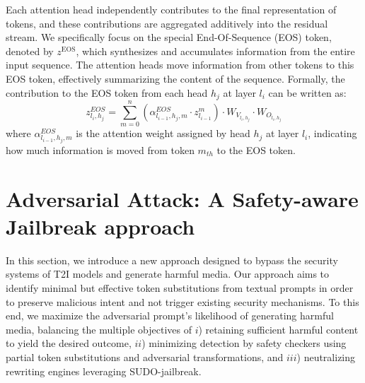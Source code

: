 \documentclass[acmsmall]{acmart}
\begin{document}
Each attention head independently contributes to the final representation of tokens, and these contributions are aggregated additively into the residual stream. We specifically focus on the special End-Of-Sequence (EOS) token, denoted by $z^{\text{EOS}}$, which synthesizes and accumulates information from the entire input sequence. The attention heads move information from other tokens to this EOS token, effectively summarizing the content of the sequence. Formally, the contribution to the EOS token from each head $h_j$ at layer $l_i$ can be written as:
\begingroup
\setlength{\abovedisplayskip}{6pt}
\setlength{\belowdisplayskip}{6pt}
\begin{equation}
  z_{l_i, h_j}^{EOS} = \sum_{m=0}^{n} \left( \alpha_{l_{i-1},h_j, m}^{EOS} \cdot z^m_{l_{i-1}} \right)\cdot W_{V_{l_i, h_j}} \cdot W_{O_{l_i, h_j}} 
\end{equation}
\endgroup
\noindent
where $\alpha_{l_{i-1},h_j, m}^{EOS}$ is the attention weight assigned by head $h_j$ at layer $l_i$, indicating how much information is moved from token $m_{th}$ to the EOS token.



\section{Adversarial Attack: A Safety-aware Jailbreak approach}\label{sec:proposed_method}
In this section, we introduce a new approach designed to bypass the security systems of T2I models and generate harmful media.
Our approach aims to identify minimal but effective token substitutions from textual prompts in order to preserve malicious intent and not trigger existing security mechanisms.
To this end, we maximize the adversarial prompt's likelihood of generating harmful media, balancing the multiple objectives of $i$) retaining sufficient harmful content to yield the desired outcome, $ii$) minimizing detection by safety checkers using partial token substitutions and adversarial transformations, and $iii$) neutralizing rewriting engines leveraging SUDO-jailbreak.
\end{document}
